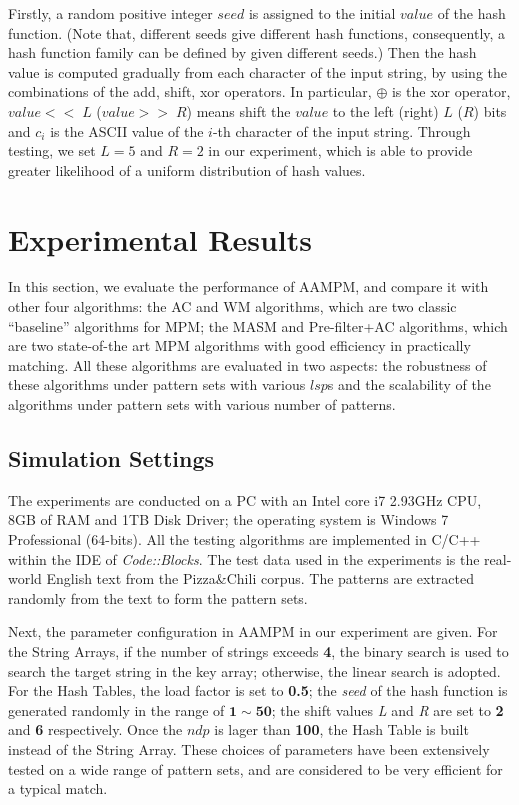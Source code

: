 \documentclass{article}
\begin{document}
Firstly, a random positive integer $seed$ is assigned to the initial
$value$ of the hash function. (Note that, different seeds give
different hash functions, consequently, a hash function family can be
defined by given different seeds.) Then the hash value is computed
gradually from each character of the input string, by using the
combinations of the \textsf{add, shift, xor} operators. In particular,
$\oplus$ is the \textsf{xor} operator, $value << \;L$ ($value >> \;R$)
means shift the $value$ to the left (right) $L$ ($R$) bits and $c_i$
is the ASCII value of the $i$-th character of the input
string. Through testing, we set $L=5$ and $R=2$ in our experiment,
which is able to provide greater likelihood of a uniform distribution
of hash values.


\section{Experimental Results}
\label{sec:experiments}

In this section, we evaluate the performance of \textsf{AAMPM}, and
compare it with other four algorithms: the \textsf{AC} and \textsf{WM}
algorithms, which are two classic ``baseline'' algorithms for MPM; the
\textsf{MASM} and \textsf{Pre-filter+AC} algorithms, which are two
state-of-the art MPM algorithms with good efficiency in practically
matching. All these algorithms are evaluated in two aspects: the
robustness of these algorithms under pattern sets with various $lsp$s
and the scalability of the algorithms under pattern sets with various
number of patterns.

\subsection{Simulation Settings}

The experiments are conducted on a PC with an Intel core i7 2.93GHz
CPU, 8GB of RAM and 1TB Disk Driver; the operating system is Windows 7
Professional (64-bits). All the testing algorithms are implemented in
C/C++ within the IDE of \emph{Code::Blocks}. The test data used in the
experiments is the real-world English text from the Pizza\;\&\;Chili
corpus. The patterns are extracted randomly from the text to form the
pattern sets.

Next, the parameter configuration in \textsf{AAMPM} in our experiment
are given. For the String Arrays, if the number of strings exceeds
\textbf{4}, the binary search is used to search the target string in
the key array; otherwise, the linear search is adopted. For the Hash
Tables, the load factor is set to \textbf{0.5}; the \emph{seed} of the
hash function is generated randomly in the range of
$\mathbf{1} \sim \mathbf{50}$; the shift values \emph{L} and \emph{R}
are set to \textbf{2} and \textbf{6} respectively. Once the $ndp$ is
lager than \textbf{100}, the Hash Table is built instead of the String
Array. These choices of parameters have been extensively tested on a
wide range of pattern sets, and are considered to be very efficient
for a typical match.
\end{document}

